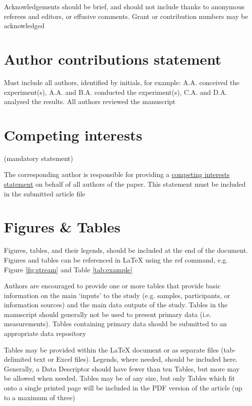 \documentclass[fleqn,10pt]{wlscirep}
\begin{document}
Acknowledgements should be brief, and should not include thanks to anonymous referees and editors, or effusive comments.
Grant or contribution numbers may be acknowledged


\section*{Author contributions statement}

Must include all authors, identified by initials, for example:
A.A.
conceived the experiment(s), A.A.
and B.A.
conducted the experiment(s), C.A.
and D.A.
analysed the results.
All authors reviewed the manuscript 


\section*{Competing interests} (mandatory statement)

The corresponding author is responsible for providing a \href{https://www.nature.com/sdata/policies/editorial-and-publishing-policies#competing}{competing interests statement} on behalf of all authors of the paper.
This statement must be included in the submitted article file


\section*{Figures \& Tables}

Figures, tables, and their legends, should be included at the end of the document.
Figures and tables can be referenced in \LaTeX{} using the ref command, e.g.
Figure \ref{fig:stream} and Table \ref{tab:example} 


Authors are encouraged to provide one or more tables that provide basic information on the main ‘inputs’ to the study (e.g.
samples, participants, or information sources) and the main data outputs of the study.
Tables in the manuscript should generally not be used to present primary data (i.e.
measurements).
Tables containing primary data should be submitted to an appropriate data repository


Tables may be provided within the \LaTeX{} document or as separate files (tab-delimited text or Excel files).
Legends, where needed, should be included here.
Generally, a Data Descriptor should have fewer than ten Tables, but more may be allowed when needed.
Tables may be of any size, but only Tables which fit onto a single printed page will be included in the PDF version of the article (up to a maximum of three) 
\end{document}
